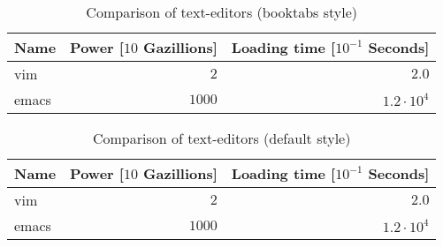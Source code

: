 \documentclass{article}
\begin{document}
\begin{table}
\centering
\label{tab:awesome_booktabs}
\begin{tabular}{lrr}
\toprule
Name 	 & Power [$10$ Gazillions] 	 & Loading time [$10^{-1}$ Seconds] \\
\midrule
vim 	 & $2$ 	 & $2.0$ \\ 	 %
emacs 	 & $1000$ 	 & $1.2\cdot 10^{4}$ \\ 	 %
\bottomrule
\end{tabular}
\caption{Comparison of text-editors (booktabs style)}
\end{table}


\begin{table}
\centering
\label{tab:awesome_default}
\begin{tabular}{lrr}
Name 	 & Power [$10$ Gazillions] 	 & Loading time [$10^{-1}$ Seconds] \\ \hline \hline
vim 	 & $2$ 	 & $2.0$ \\ \hline 	 %
emacs 	 & $1000$ 	 & $1.2\cdot 10^{4}$ \\ \hline 	 %
 \hline
\end{tabular}
\caption{Comparison of text-editors (default style)}
\end{table}
\end{document}
